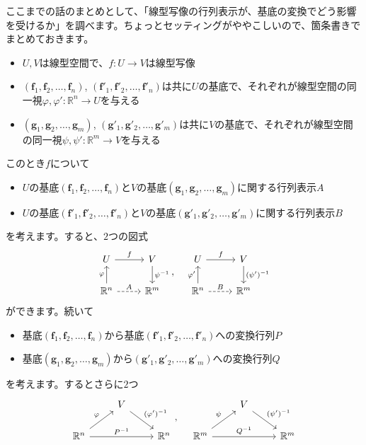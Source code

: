 ここまでの話のまとめとして、「線型写像の行列表示が、基底の変換でどう影響を受けるか」を調べます。ちょっとセッティングがややこしいので、箇条書きでまとめておきます。
\begin{itemize}
\item $U, V$は線型空間で、$f\colon U\rightarrow V$は線型写像
\item $(\bm{f}_1, \bm{f}_2, \ldots, \bm{f}_n)$, $(\bm{f}'_1, \bm{f}'_2, \ldots, \bm{f}'_n)$は共に$U$の基底で、それぞれが線型空間の同一視$\varphi, \varphi'\colon \mathbb{R}^n \rightarrow U$を与える
\item $(\bm{g}_1, \bm{g}_2, \ldots, \bm{g}_m)$, $(\bm{g}'_1, \bm{g}'_2, \ldots, \bm{g}'_m)$は共に$V$の基底で、それぞれが線型空間の同一視$\psi, \psi'\colon \mathbb{R}^m \rightarrow V$を与える
\end{itemize}
このとき$f$について
\begin{itemize}
\item $U$の基底$(\bm{f}_1, \bm{f}_2, \ldots, \bm{f}_n)$と$V$の基底$(\bm{g}_1, \bm{g}_2, \ldots, \bm{g}_m)$に関する行列表示$A$
\item $U$の基底$(\bm{f}'_1, \bm{f}'_2, \ldots, \bm{f}'_n)$と$V$の基底$(\bm{g}'_1, \bm{g}'_2, \ldots, \bm{g}'_m)$に関する行列表示$B$
\end{itemize}
を考えます。すると、$2$つの図式
\[
\begin{tikzcd}
U \arrow{r}{f} & V \arrow{d}{\psi^{-1}} \\
\mathbb{R}^n \arrow{u}{\varphi} \arrow[dashed]{r}{A} & \mathbb{R}^m
\end{tikzcd}, \quad
\begin{tikzcd}
U \arrow{r}{f} & V \arrow{d}{(\psi')^{-1}} \\
\mathbb{R}^n \arrow{u}{\varphi'} \arrow[dashed]{r}{B} & \mathbb{R}^m
\end{tikzcd}
\]
ができます。続いて
\begin{itemize}
\item 基底$(\bm{f}_1, \bm{f}_2, \ldots, \bm{f}_n)$から基底$(\bm{f}'_1, \bm{f}'_2, \ldots, \bm{f}'_n)$への変換行列$P$
\item 基底$(\bm{g}_1, \bm{g}_2, \ldots, \bm{g}_m)$から$(\bm{g}'_1, \bm{g}'_2, \ldots, \bm{g}'_m)$への変換行列$Q$
\end{itemize}
を考えます。するとさらに$2$つ
\[
\begin{tikzcd}
& V \arrow{dr}{(\varphi')^{-1}} & \\
\mathbb{R}^n \arrow{rr}{P^{-1}} \arrow{ur}{\varphi} & & \mathbb{R}^n
\end{tikzcd}, \quad
\begin{tikzcd}
& V \arrow{dr}{(\psi')^{-1}} & \\
\mathbb{R}^m \arrow{rr}{Q^{-1}} \arrow{ur}{\psi} & & \mathbb{R}^m
\end{tikzcd}
\]
